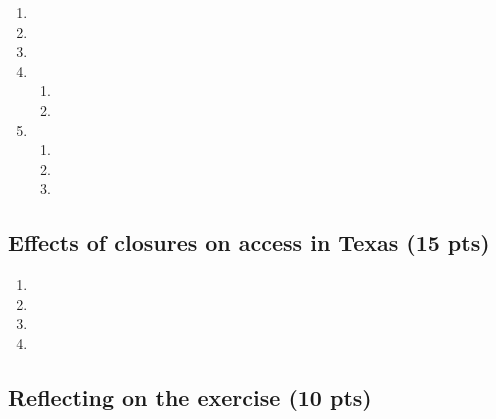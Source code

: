 \documentclass[
  letterpaper,
  DIV=11,
  numbers=noendperiod]{scrartcl}
\providecommand{\tightlist}{%
  \setlength{\itemsep}{0pt}\setlength{\parskip}{0pt}}\usepackage{longtable,booktabs,array}
\begin{document}
\begin{enumerate}
\def\labelenumi{\arabic{enumi}.}
\tightlist
\item
\item
\item
\item
  \begin{enumerate}
  \def\labelenumii{\alph{enumii}.}
  \tightlist
  \item
  \item
  \end{enumerate}
\item
  \begin{enumerate}
  \def\labelenumii{\alph{enumii}.}
  \tightlist
  \item
  \item
  \item
  \end{enumerate}
\end{enumerate}

\subsection{Effects of closures on access in Texas (15
pts)}\label{effects-of-closures-on-access-in-texas-15-pts}

\begin{enumerate}
\def\labelenumi{\arabic{enumi}.}
\tightlist
\item
\item
\item
\item
\end{enumerate}

\subsection{Reflecting on the exercise (10
pts)}\label{reflecting-on-the-exercise-10-pts}
\end{document}
